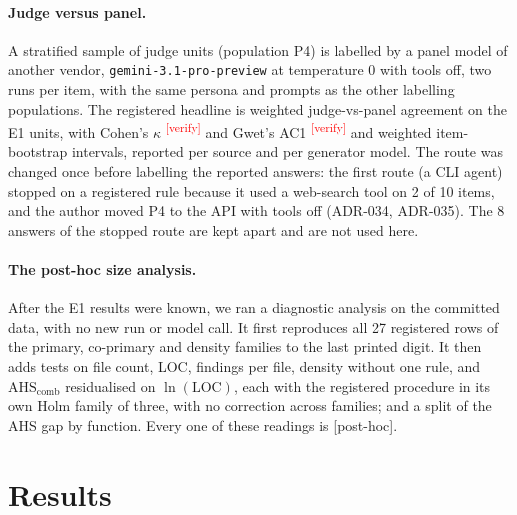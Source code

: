 \documentclass[10pt,a4paper]{article}
\newcommand{\citeneeded}[1]{\cite{#1}\textsuperscript{\textcolor{red}{\tiny[verify]}}}
\newcommand{\ph}{\textsf{\scriptsize[post-hoc]}}    %
\newcommand{\AHSc}{\mathrm{AHS}_{\mathrm{comb}}}
\begin{document}
\paragraph{Judge versus panel.} A stratified sample of judge units (population P4) is labelled by a panel model of
another vendor, \texttt{gemini-3.1-pro-preview} at temperature 0 with tools off, two runs per item, with the same
persona and prompts as the other labelling populations. %
The registered headline is weighted judge-vs-panel agreement on the E1 units, with Cohen's $\kappa$
\citeneeded{cohen1960} and Gwet's AC1 \citeneeded{gwet2008} and weighted item-bootstrap intervals, reported per
source and per generator model. %
The route was changed once before labelling the reported answers: the first route (a CLI agent) stopped on a
registered rule because it used a web-search tool on 2 of 10 items, and the author moved P4 to the API with tools
off (ADR-034, ADR-035). The 8 answers of the stopped route are kept apart and are not used here.

\paragraph{The post-hoc size analysis.} After the E1 results were known, we ran a diagnostic analysis on the
committed data, with no new run or model call. %
It first reproduces all 27 registered rows of the primary, co-primary and density families to the last printed
digit. %
It then adds tests on file count, LOC, findings per file, density without one rule, and $\AHSc$ residualised on
$\ln(\mathrm{LOC})$, each with the registered procedure in its own Holm family of three, with no correction across
families; and a split of the AHS gap by function. Every one of these readings is \ph{}.

\section{Results}\label{sec:results}
\end{document}
